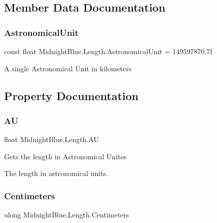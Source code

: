 \subsection{Member Data Documentation}
\hypertarget{class_midnight_blue_1_1_length_a5e86fa7e1d296ca9e6c5406a863427a6}{}\label{class_midnight_blue_1_1_length_a5e86fa7e1d296ca9e6c5406a863427a6} 
\subsubsection{\texorpdfstring{Astronomical\+Unit}{AstronomicalUnit}}
{\footnotesize\ttfamily const float Midnight\+Blue.\+Length.\+Astronomical\+Unit = 149597870.\+7f}



A single Astronomical Unit in kilometers 



\subsection{Property Documentation}
\hypertarget{class_midnight_blue_1_1_length_aa2325bd4894b015715784b027551826f}{}\label{class_midnight_blue_1_1_length_aa2325bd4894b015715784b027551826f} 
\subsubsection{\texorpdfstring{AU}{AU}}
{\footnotesize\ttfamily float Midnight\+Blue.\+Length.\+AU\hspace{0.3cm}{\ttfamily [get]}}



Gets the length in Astronomical Unites 

The length in astronomical units.\hypertarget{class_midnight_blue_1_1_length_a935aac3abfc2865e5960a40382227063}{}\label{class_midnight_blue_1_1_length_a935aac3abfc2865e5960a40382227063} 
\subsubsection{\texorpdfstring{Centimeters}{Centimeters}}
{\footnotesize\ttfamily ulong Midnight\+Blue.\+Length.\+Centimeters\hspace{0.3cm}{\ttfamily [get]}}



